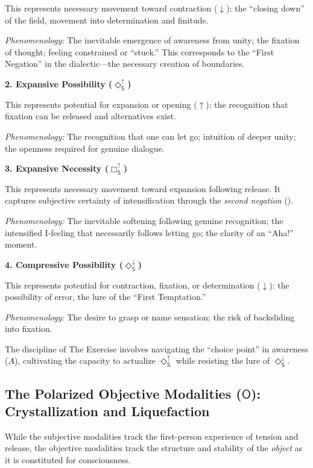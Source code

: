 \documentclass[12pt]{book}
\newcommand{\SBoxUp}{\Box_{\mathsf{S}}^{\uparrow}}
\newcommand{\SDiaUp}{\Diamond_{\mathsf{S}}^{\uparrow}}
\newcommand{\SDiaDown}{\Diamond_{\mathsf{S}}^{\downarrow}}
\begin{document}
This represents necessary movement toward contraction ($\downarrow$): the ``closing down'' of the field, movement into determination and finitude.

\textit{Phenomenology:} The inevitable emergence of awareness from unity; the fixation of thought; feeling constrained or ``stuck.'' This corresponds to the ``First Negation'' in the dialectic---the necessary creation of boundaries.

\bigskip

\noindent\textbf{2. Expansive Possibility ($\SDiaUp$)}

This represents potential for expansion or opening ($\uparrow$): the recognition that fixation can be released and alternatives exist.

\textit{Phenomenology:} The recognition that one can let go; intuition of deeper unity; the openness required for genuine dialogue.

\bigskip

\noindent\textbf{3. Expansive Necessity ($\SBoxUp$)}

This represents necessary movement toward expansion following release. It captures subjective certainty of intensification through the \textit{second negation} ().

\textit{Phenomenology:} The inevitable softening following genuine recognition; the intensified I-feeling that necessarily follows letting go; the clarity of an ``Aha!'' moment.

\bigskip

\noindent\textbf{4. Compressive Possibility ($\SDiaDown$)}

This represents potential for contraction, fixation, or determination ($\downarrow$): the possibility of error, the lure of the ``First Temptation.''

\textit{Phenomenology:} The desire to grasp or name sensation; the risk of backsliding into fixation.

\bigskip

The discipline of The Exercise involves navigating the ``choice point'' in awareness ($A$), cultivating the capacity to actualize $\SDiaUp$ while resisting the lure of $\SDiaDown$.

\subsection{The Polarized Objective Modalities ($\mathsf{O}$): Crystallization and Liquefaction}

While the subjective modalities track the first-person experience of tension and release, the objective modalities track the structure and stability of the \textit{object} as it is constituted for consciousness.
\end{document}
